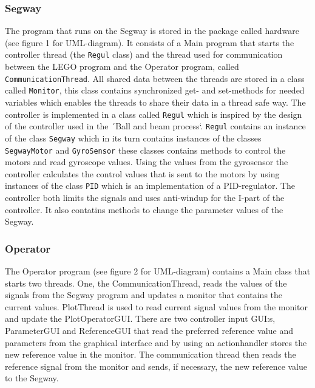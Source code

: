 \subsubsection{Segway}
The program that runs on the Segway is stored in the package called hardware (see figure 1 for UML-diagram). It consists of a Main program that starts the controller thread (the \texttt{Regul} class) and the thread used for communication between the LEGO program and the Operator program, called \texttt{CommunicationThread}. All shared data between the threads are stored in a class called \texttt{Monitor}, this class contains synchronized get- and set-methods for needed variables which enables the threads to share their data in a thread safe way. The controller is implemented in a class called \texttt{Regul} which is inspired by the design of the controller used in the ´Ball and beam process`. \texttt{Regul} contains an instance of the class \texttt{Segway} which in its turn contains instances of the classes \texttt{SegwayMotor} and \texttt{GyroSensor} these classes contains methods to control the motors and read gyroscope values. Using the values from the gyrosensor the controller calculates the control values that is sent to the motors by using instances of the class \texttt{PID} which is an implementation of a PID-regulator. The controller both limits the signals and uses anti-windup for the I-part of the controller. It also contatins methods to change the parameter values of the Segway.


\subsubsection{Operator}
The Operator program (see figure 2 for UML-diagram)  contains a Main class that starts two threads. One, the CommunicationThread, reads the values of the signals from the Segway program and updates a monitor that contains the current values. PlotThread is used to read current signal values from the monitor and update the PlotOperatorGUI. There are two controller input GUI:s, ParameterGUI and ReferenceGUI that read the preferred reference value and parameters from the graphical interface and by using an actionhandler stores the new reference value in the monitor. The communication thread then reads the reference signal from the monitor and sends, if necessary, the new reference value to the Segway.

